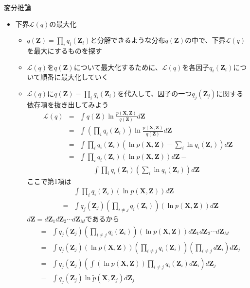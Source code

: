 \documentclass[dvipdfmx,notheorems,t]{beamer}
\begin{document}
\begin{frame}{変分推論}

\begin{itemize}
	\item 下界$\mathcal{L}(q)$の最大化
	\begin{itemize}
		\item $q(\bm{Z}) = \prod_i q_i(\bm{Z}_i)$と分解できるような分布$q(\bm{Z})$の中で、\color{red}下界$\mathcal{L}(q)$を最大にするもの\normalcolor を探す
		\newline
		\item $\mathcal{L}(q)$を$q(\bm{Z})$について最大化するために、$\mathcal{L}(q)$を各因子$q_i(\bm{Z}_i)$について\color{red}順番に最大化\normalcolor していく
		\item $\mathcal{L}(q)$に$q(\bm{Z}) = \prod_i q_i(\bm{Z}_i)$を代入して、因子の一つ$q_j(\bm{Z}_j)$に関する\alert{依存項}を抜き出してみよう
		\begin{eqnarray}
			\mathcal{L}(q) &=& \int q(\bm{Z}) \ln \frac{p(\bm{X}, \bm{Z})}{q(\bm{Z})} d\bm{Z} \\
			&=& \int \left( \prod_i q_i(\bm{Z}_i) \right) \ln \frac{p(\bm{X}, \bm{Z})}{q(\bm{Z})} d\bm{Z} \\
			&=& \int \prod_i q_i(\bm{Z}_i) \left( \ln p(\bm{X}, \bm{Z}) - \sum_i \ln q_i(\bm{Z}_i) \right) d\bm{Z} \\
			&=& \int \prod_i q_i(\bm{Z}_i) \left( \ln p(\bm{X}, \bm{Z}) \right) d\bm{Z} - \nonumber \\
			&& \qquad \int \prod_i q_i(\bm{Z}_i) \left( \sum_i \ln q_i(\bm{Z}_i) \right) d\bm{Z}
		\end{eqnarray}
		ここで第1項は
		\begin{eqnarray}
			&& \int \prod_i q_i(\bm{Z}_i) \left( \ln p(\bm{X}, \bm{Z}) \right) d\bm{Z} \nonumber \\
			&=& \int q_j(\bm{Z}_j) \left( \prod_{i \neq j} q_i(\bm{Z}_i) \right) \left( \ln p(\bm{X}, \bm{Z}) \right) d\bm{Z}
		\end{eqnarray}
		$d\bm{Z} = d\bm{Z}_1 d\bm{Z}_2 \cdots d\bm{Z}_M$であるから
		\begin{eqnarray}
			&=& \int q_j(\bm{Z}_j) \left( \prod_{i \neq j} q_i(\bm{Z}_i) \right) \left( \ln p(\bm{X}, \bm{Z}) \right) d\bm{Z}_1 d\bm{Z}_2 \cdots d\bm{Z}_M \\
			&=& \int q_j(\bm{Z}_j) \left( \ln p(\bm{X}, \bm{Z}) \right) \left( \prod_{i \neq j} q_i(\bm{Z}_i) \right) \left( \prod_{i \neq j} d\bm{Z}_i \right) d\bm{Z}_j \\
			&=& \int q_j(\bm{Z}_j) \left( \int \left( \ln p(\bm{X}, \bm{Z}) \right) \prod_{i \neq j} q_i(\bm{Z}_i) d\bm{Z}_i \right) d\bm{Z}_j \\
			&=& \int q_j(\bm{Z}_j) \ln \widetilde{p}(\bm{X}, \bm{Z}_j) d\bm{Z}_j
		\end{eqnarray}
		

\end{itemize}
\end{itemize}
\end{frame}
\end{document}
